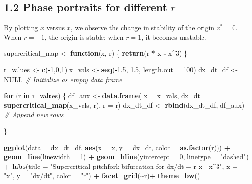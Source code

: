 \documentclass[
]{article}
\newenvironment{Shaded}{\begin{snugshade}}{\end{snugshade}}
\newcommand{\AttributeTok}[1]{\textcolor[rgb]{0.13,0.29,0.53}{#1}}
\newcommand{\CommentTok}[1]{\textcolor[rgb]{0.56,0.35,0.01}{\textit{#1}}}
\newcommand{\ConstantTok}[1]{\textcolor[rgb]{0.56,0.35,0.01}{#1}}
\newcommand{\ControlFlowTok}[1]{\textcolor[rgb]{0.13,0.29,0.53}{\textbf{#1}}}
\newcommand{\DecValTok}[1]{\textcolor[rgb]{0.00,0.00,0.81}{#1}}
\newcommand{\FloatTok}[1]{\textcolor[rgb]{0.00,0.00,0.81}{#1}}
\newcommand{\FunctionTok}[1]{\textcolor[rgb]{0.13,0.29,0.53}{\textbf{#1}}}
\newcommand{\NormalTok}[1]{#1}
\newcommand{\OtherTok}[1]{\textcolor[rgb]{0.56,0.35,0.01}{#1}}
\newcommand{\SpecialCharTok}[1]{\textcolor[rgb]{0.81,0.36,0.00}{\textbf{#1}}}
\newcommand{\StringTok}[1]{\textcolor[rgb]{0.31,0.60,0.02}{#1}}
\begin{document}
\subsection{\texorpdfstring{\textbf{1.2 Phase portraits for different
\(r\)}}{1.2 Phase portraits for different r}}\label{phase-portraits-for-different-r}

By plotting \(\dot{x}\) versus \(x\), we observe the change in stability
of the origin \(x^* = 0\). When \(r = -1\), the origin is stable; when
\(r = 1\), it becomes unstable.

\begin{Shaded}
\begin{Highlighting}[]
\NormalTok{supercritical\_map }\OtherTok{\textless{}{-}} \ControlFlowTok{function}\NormalTok{(x, r) \{}
  \FunctionTok{return}\NormalTok{(r }\SpecialCharTok{*}\NormalTok{ x }\SpecialCharTok{{-}}\NormalTok{ x}\SpecialCharTok{\^{}}\DecValTok{3}\NormalTok{)}
\NormalTok{\}}

\NormalTok{r\_values }\OtherTok{\textless{}{-}} \FunctionTok{c}\NormalTok{(}\SpecialCharTok{{-}}\DecValTok{1}\NormalTok{,}\DecValTok{0}\NormalTok{,}\DecValTok{1}\NormalTok{)}
\NormalTok{x\_vals }\OtherTok{\textless{}{-}} \FunctionTok{seq}\NormalTok{(}\SpecialCharTok{{-}}\FloatTok{1.5}\NormalTok{, }\FloatTok{1.5}\NormalTok{, }\AttributeTok{length.out =} \DecValTok{100}\NormalTok{)}
\NormalTok{dx\_dt\_df }\OtherTok{\textless{}{-}} \ConstantTok{NULL}  \CommentTok{\# Initialize as empty data frame}

\ControlFlowTok{for}\NormalTok{ (r }\ControlFlowTok{in}\NormalTok{ r\_values) \{}
\NormalTok{  df\_aux }\OtherTok{\textless{}{-}} \FunctionTok{data.frame}\NormalTok{(}
    \AttributeTok{x =}\NormalTok{ x\_vals,}
    \AttributeTok{dx\_dt =} \FunctionTok{supercritical\_map}\NormalTok{(x\_vals, r),}
    \AttributeTok{r =}\NormalTok{ r)}
\NormalTok{  dx\_dt\_df }\OtherTok{\textless{}{-}} \FunctionTok{rbind}\NormalTok{(dx\_dt\_df, df\_aux)  }\CommentTok{\# Append new rows}

\NormalTok{\}}

\FunctionTok{ggplot}\NormalTok{(}\AttributeTok{data =}\NormalTok{ dx\_dt\_df, }
       \FunctionTok{aes}\NormalTok{(}\AttributeTok{x =}\NormalTok{ x, }\AttributeTok{y =}\NormalTok{ dx\_dt, }\AttributeTok{color =} \FunctionTok{as.factor}\NormalTok{(r))) }\SpecialCharTok{+}
  \FunctionTok{geom\_line}\NormalTok{(}\AttributeTok{linewidth =} \DecValTok{1}\NormalTok{) }\SpecialCharTok{+}
  \FunctionTok{geom\_hline}\NormalTok{(}\AttributeTok{yintercept =} \DecValTok{0}\NormalTok{, }\AttributeTok{linetype =} \StringTok{"dashed"}\NormalTok{) }\SpecialCharTok{+}
  \FunctionTok{labs}\NormalTok{(}\AttributeTok{title =} \StringTok{"Supercritical pitchfork bifurcation for dx/dt = r x {-} x\^{}3"}\NormalTok{, }
       \AttributeTok{x =} \StringTok{"x"}\NormalTok{, }\AttributeTok{y =} \StringTok{"dx/dt"}\NormalTok{, }\AttributeTok{color =} \StringTok{"r"}\NormalTok{) }\SpecialCharTok{+}
  \FunctionTok{facet\_grid}\NormalTok{(}\SpecialCharTok{\textasciitilde{}}\NormalTok{r)}\SpecialCharTok{+}
  \FunctionTok{theme\_bw}\NormalTok{()}
\end{Highlighting}
\end{Shaded}
\end{document}
